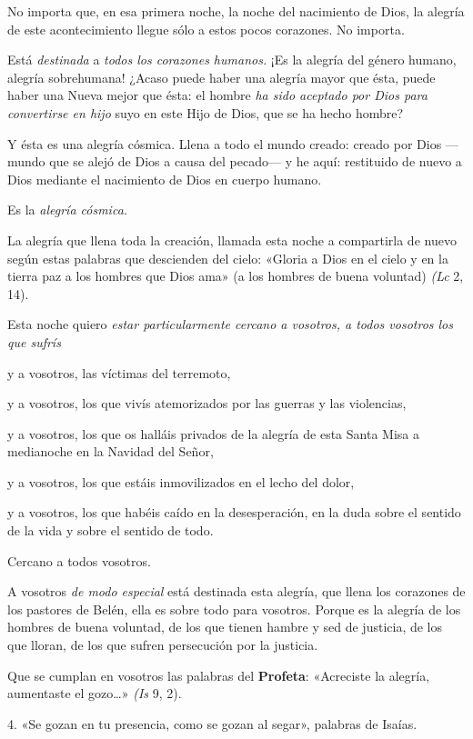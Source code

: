 \documentclass[]{article}
\begin{document}
No importa que, en esa primera noche, la noche del nacimiento de Dios,
la alegría de este acontecimiento llegue sólo a estos pocos corazones.
No importa.

Está \emph{destinada} a \emph{todos los corazones humanos.} ¡Es la
alegría del género humano, alegría sobrehumana! ¿Acaso puede haber una
alegría mayor que ésta, puede haber una Nueva mejor que ésta: el hombre
\emph{ha sido aceptado por Dios para convertirse en hijo} suyo en este
Hijo de Dios, que se ha hecho hombre?

Y ésta es una alegría cósmica. Llena a todo el mundo creado: creado por
Dios ---mundo que se alejó de Dios a causa del pecado--- y he aquí:
restituido de nuevo a Dios mediante el nacimiento de Dios en cuerpo
humano.

Es la \emph{alegría cósmica. }

La alegría que llena toda la creación, llamada esta noche a compartirla
de nuevo según estas palabras que descienden del cielo: «Gloria a Dios
en el cielo y en la tierra paz a los hombres que Dios ama» (a los
hombres de buena voluntad) \emph{(Lc} 2, 14).

Esta noche quiero \emph{estar particularmente cercano a vosotros, a
todos vosotros los que sufrís }

y a vosotros, las víctimas del terremoto,

y a vosotros, los que vivís atemorizados por las guerras y las
violencias,

y a vosotros, los que os halláis privados de la alegría de esta Santa
Misa a medianoche en la Navidad del Señor,

y a vosotros, los que estáis inmovilizados en el lecho del dolor,

y a vosotros, los que habéis caído en la desesperación, en la duda sobre
el sentido de la vida y sobre el sentido de todo.

Cercano a todos vosotros.

A vosotros \emph{de modo especial} está destinada esta alegría, que
llena los corazones de los pastores de Belén, ella es sobre todo para
vosotros. Porque es la alegría de los hombres de buena voluntad, de los
que tienen hambre y sed de justicia, de los que lloran, de los que
sufren persecución por la justicia.

Que se cumplan en vosotros las palabras del \textbf{Profeta}: «Acreciste
la alegría, aumentaste el gozo\ldots{}» \emph{(Is} 9, 2).

4. «Se gozan en tu presencia, como se gozan al segar», palabras de
Isaías.
\end{document}

